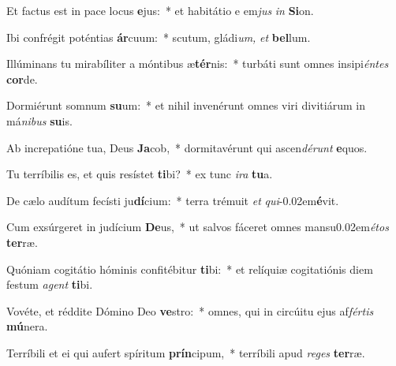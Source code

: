 \item Et factus est in pace locus \textbf{e}jus:~* et habitátio e em\textit{jus} \textit{in} \textbf{Si}on.
\item Ibi confrégit poténtias \textbf{ár}cuum:~* scutum, gládi\textit{um,} \textit{et} \textbf{bel}lum.
\item Illúminans tu mirabíliter a móntibus æ\textbf{tér}nis:~* turbáti sunt omnes insipi\textit{éntes} \textbf{cor}de.
\item Dormiérunt somnum \textbf{su}um:~* et nihil invenérunt omnes viri divitiárum in má\textit{nibus} \textbf{su}is.
\item Ab increpatióne tua, Deus \textbf{Ja}cob,~* dormitavérunt qui ascen\textit{dérunt} \textbf{e}quos.
\item Tu terríbilis es, et quis resístet \textbf{ti}bi?~* ex tunc \textit{ira} \textbf{tu}a.
\item De cælo audítum fecísti ju\textbf{dí}cium:~* terra trémuit \textit{et} \textit{qui}\kern -0.02em\textbf{é}vit.
\item Cum exsúrgeret in judícium \textbf{De}us,~* ut salvos fáceret omnes mansu\kern 0.02em\textit{étos} \textbf{ter}ræ.
\item Quóniam cogitátio hóminis confitébitur \textbf{ti}bi:~* et relíquiæ cogitatiónis diem festum \textit{agent} \textbf{ti}bi.
\item Vovéte, et réddite Dómino Deo \textbf{ve}stro:~* omnes, qui in circúitu ejus af\textit{fértis} \textbf{mú}nera.
\item Terríbili et ei qui aufert spíritum \textbf{prín}cipum,~* terríbili apud \textit{reges} \textbf{ter}ræ.
